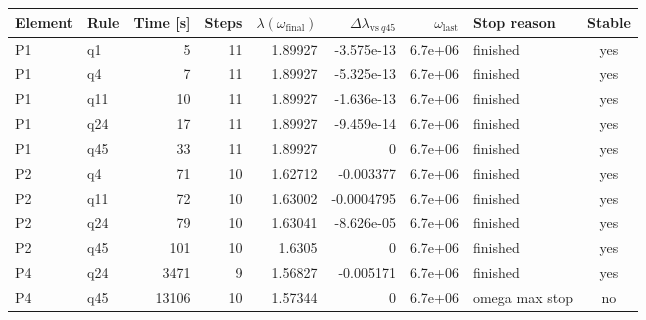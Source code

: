 \begin{tabularx}{\textwidth}{@{}llrrrrrXc@{}}
\toprule
Element & Rule & Time [s] & Steps & $\lambda(\omega_{\mathrm{final}})$ & $\Delta\lambda_{\mathrm{vs}\ q45}$ & $\omega_{\mathrm{last}}$ & Stop reason & Stable \\
\midrule
P1 & q1 & 5 & 11 & 1.89927 & -3.575e-13 & 6.7e+06 & finished & yes \\
P1 & q4 & 7 & 11 & 1.89927 & -5.325e-13 & 6.7e+06 & finished & yes \\
P1 & q11 & 10 & 11 & 1.89927 & -1.636e-13 & 6.7e+06 & finished & yes \\
P1 & q24 & 17 & 11 & 1.89927 & -9.459e-14 & 6.7e+06 & finished & yes \\
P1 & q45 & 33 & 11 & 1.89927 & 0 & 6.7e+06 & finished & yes \\
P2 & q4 & 71 & 10 & 1.62712 & -0.003377 & 6.7e+06 & finished & yes \\
P2 & q11 & 72 & 10 & 1.63002 & -0.0004795 & 6.7e+06 & finished & yes \\
P2 & q24 & 79 & 10 & 1.63041 & -8.626e-05 & 6.7e+06 & finished & yes \\
P2 & q45 & 101 & 10 & 1.6305 & 0 & 6.7e+06 & finished & yes \\
P4 & q24 & 3471 & 9 & 1.56827 & -0.005171 & 6.7e+06 & finished & yes \\
P4 & q45 & 13106 & 10 & 1.57344 & 0 & 6.7e+06 & omega max stop & no \\
\bottomrule
\end{tabularx}
